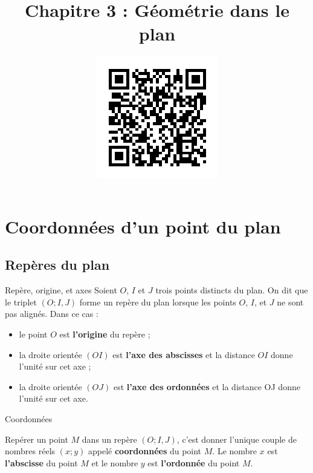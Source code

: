\documentclass[11pt]{article}
\title{\vspace{-15mm}Chapitre 3 : Géométrie dans le plan}
\date{\vspace{-14mm}
\href{https://erou.forge.aeif.fr/s11/geom.html}{
  \includegraphics[scale=.6]{qr-géométrie-plan.png}}
\vspace{-12mm}}
\author{}
\begin{document}
\maketitle\thispagestyle{fancy}

\section{Coordonnées d'un point du plan}
\subsection{Repères du plan}

\begin{defi}{Repère, origine, et axes}
  Soient $O$, $I$ et $J$ trois points distincts du plan. On dit que le triplet
  $(O; I, J)$ forme un repère du plan lorsque les points $O$, $I$, et $J$ ne
  sont pas alignés. Dans ce cas :
  \begin{itemize}
    \item le point $O$ est \textbf{l'origine} du repère ;
    \item la droite orientée $(OI)$ est \textbf{l'axe des abscisses} et la
      distance $OI$ donne l'unité sur cet axe ;
    \item la droite orientée $(OJ)$ est \textbf{l'axe des ordonnées} et la
      distance OJ donne l'unité sur cet axe.
  \end{itemize}
\end{defi}

\begin{defi}{Coordonnées}
  \label{defi1}
  \begin{minipage}{.5\textwidth}
  Repérer un point $M$ dans un repère $(O; I, J)$, c'est donner l'unique couple
  de nombres réels $(x; y)$ appelé \textbf{coordonnées} du point $M$. Le nombre
  $x$ est \textbf{l'abscisse} du point $M$ et le nombre $y$ est
  \textbf{l'ordonnée} du point $M$.
  \end{minipage}
  \begin{minipage}{.5\textwidth}
    \begin{center}
    \end{center}
  \end{minipage}
\end{defi}
\end{document}
